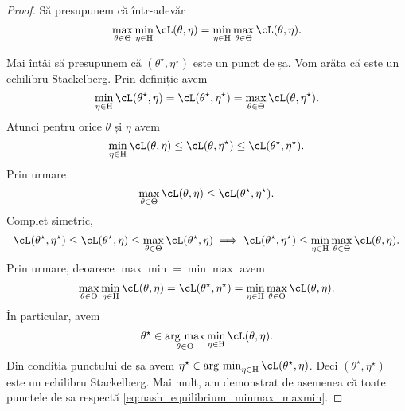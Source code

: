 \documentclass[../../book-main_ro.tex]{subfiles}
\begin{document}
\begin{proof} %
    Să presupunem că într-adevăr 
    \begin{equation}
        \max_{\theta \in \Theta}\min_{\eta \in \Eta}\cL(\theta, \eta) = \min_{\eta \in \Eta}\max_{\theta  \in \Theta}\cL(\theta, \eta).
    \end{equation}

    Mai întâi să presupunem că \((\theta^{\star}, \eta^{\star})\) este un punct de șa. Vom arăta că este un echilibru Stackelberg. Prin definiție avem 
    \begin{equation}
        \min_{\eta \in \Eta}\cL(\theta^{\star}, \eta) = \cL(\theta^{\star}, \eta^{\star}) = \max_{\theta \in \Theta}\cL(\theta, \eta^{\star}).
    \end{equation}
    Atunci pentru orice \(\theta\) și \(\eta\) avem 
    \begin{equation}
        \min_{\eta \in \Eta}\cL(\theta, \eta) \leq \cL(\theta, \eta^{\star}) \leq \cL(\theta^{\star}, \eta^{\star}).
    \end{equation}
    Prin urmare
    \begin{equation}
        \max_{\theta \in \Theta}\cL(\theta, \eta) \leq \cL(\theta^{\star}, \eta^{\star}).
    \end{equation}
    Complet simetric, 
    \begin{equation}
        \cL(\theta^{\star}, \eta^{\star}) \leq \cL(\theta^{\star}, \eta) \leq \max_{\theta \in \Theta}\cL(\theta^{\star}, \eta) \implies \cL(\theta^{\star}, \eta^{\star}) \leq \min_{\eta \in \Eta}\max_{\theta \in \Theta}\cL(\theta, \eta).
    \end{equation}
    Prin urmare, deoarece \(\max\min = \min\max\) avem 
    \begin{equation}\label{eq:nash_equilibrium_minmax_maxmin}
        \max_{\theta \in \Theta}\min_{\eta \in \Eta}\cL(\theta, \eta) = \cL(\theta^{\star}, \eta^{\star}) = \min_{\eta \in \Eta}\max_{\theta \in \Theta}\cL(\theta, \eta).
    \end{equation}
    În particular, avem
    \begin{equation}
        \theta^{\star} \in \argmax_{\theta \in \Theta}\min_{\eta \in \Eta}\cL(\theta, \eta).
    \end{equation}
    Din condiția punctului de șa avem \(\eta^{\star} \in \argmin_{\eta \in \Eta}\cL(\theta^{\star}, \eta)\). Deci \((\theta^{\star}, \eta^{\star})\) este un echilibru Stackelberg. Mai mult, am demonstrat de asemenea că toate punctele de șa respectă \eqref{eq:nash_equilibrium_minmax_maxmin}.


\end{proof}
\end{document}
